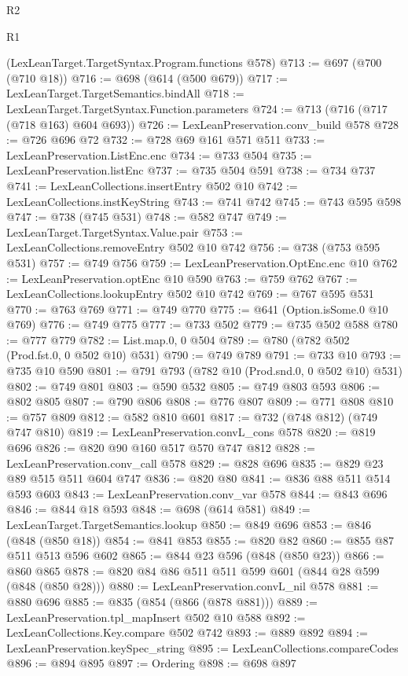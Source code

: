 \begin{lexlean}{R2}
\begin{lexlean}{R1}
\begin{coremodule}
{{{{{{{{{{{{{{{{{{{{    (LexLeanTarget.TargetSyntax.Program.functions @578)
@713 := @697 (@700 (@710 @18))
@716 := @698 (@614 (@500 @679))
@717 := LexLeanTarget.TargetSemantics.bindAll
@718 := LexLeanTarget.TargetSyntax.Function.parameters
@724 := @713 (@716 (@717 (@718 @163) @604 @693))
@726 := LexLeanPreservation.conv_build @578
@728 := @726 @696 @72
@732 := @728 @69 @161 @571 @511
@733 := LexLeanPreservation.ListEnc.enc
@734 := @733 @504
@735 := LexLeanPreservation.listEnc
@737 := @735 @504 @591
@738 := @734 @737
@741 := LexLeanCollections.insertEntry @502 @10
@742 := LexLeanCollections.instKeyString
@743 := @741 @742
@745 := @743 @595 @598
@747 := @738 (@745 @531)
@748 := @582 @747
@749 := LexLeanTarget.TargetSyntax.Value.pair
@753 := LexLeanCollections.removeEntry @502 @10 @742
@756 := @738 (@753 @595 @531)
@757 := @749 @756
@759 := LexLeanPreservation.OptEnc.enc @10
@762 := LexLeanPreservation.optEnc @10 @590
@763 := @759 @762
@767 := LexLeanCollections.lookupEntry @502 @10 @742
@769 := @767 @595 @531
@770 := @763 @769
@771 := @749 @770
@775 := @641 (Option.isSome.{0} @10 @769)
@776 := @749 @775
@777 := @733 @502
@779 := @735 @502 @588
@780 := @777 @779
@782 := List.map.{0, 0} @504
@789 := @780 (@782 @502 (Prod.fst.{0, 0} @502 @10) @531)
@790 := @749 @789
@791 := @733 @10
@793 := @735 @10 @590
@801 := @791 @793 (@782 @10 (Prod.snd.{0, 0} @502 @10) @531)
@802 := @749 @801
@803 := @590 @532
@805 := @749 @803 @593
@806 := @802 @805
@807 := @790 @806
@808 := @776 @807
@809 := @771 @808
@810 := @757 @809
@812 := @582 @810 @601
@817 := @732 (@748 @812) (@749 @747 @810)
@819 := LexLeanPreservation.convL_cons @578
@820 := @819 @696
@826 := @820 @90 @160 @517 @570 @747 @812
@828 := LexLeanPreservation.conv_call @578
@829 := @828 @696
@835 := @829 @23 @89 @515 @511 @604 @747
@836 := @820 @80
@841 := @836 @88 @511 @514 @593 @603
@843 := LexLeanPreservation.conv_var @578
@844 := @843 @696
@846 := @844 @18 @593
@848 := @698 (@614 @581)
@849 := LexLeanTarget.TargetSemantics.lookup
@850 := @849 @696
@853 := @846 (@848 (@850 @18))
@854 := @841 @853
@855 := @820 @82
@860 := @855 @87 @511 @513 @596 @602
@865 := @844 @23 @596 (@848 (@850 @23))
@866 := @860 @865
@878 := @820 @84 @86 @511 @511 @599 @601 (@844 @28 @599 (@848 (@850 @28)))
@880 := LexLeanPreservation.convL_nil @578
@881 := @880 @696
@885 := @835 (@854 (@866 (@878 @881)))
@889 := LexLeanPreservation.tpl_mapInsert @502 @10 @588
@892 := LexLeanCollections.Key.compare @502 @742
@893 := @889 @892
@894 := LexLeanPreservation.keySpec_string
@895 := LexLeanCollections.compareCodes
@896 := @894 @895
@897 := Ordering
@898 := @698 @897
}}}}}}}}}}}}}}}}}}}}
\end{coremodule}
\end{lexlean}
\end{lexlean}
